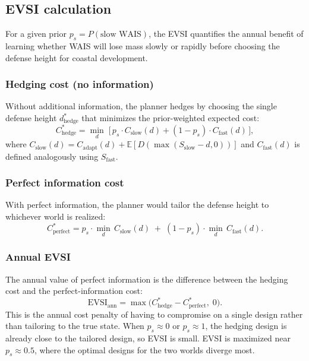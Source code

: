 \documentclass[12pt]{article}
\begin{document}
\subsection{EVSI calculation}

For a given prior $p_s = P(\text{slow WAIS})$, the EVSI quantifies the annual benefit of learning whether WAIS will lose mass slowly or rapidly before choosing the defense height for coastal development.

\subsubsection{Hedging cost (no information)}

Without additional information, the planner hedges by choosing the single defense height $d^*_{\mathrm{hedge}}$ that minimizes the prior-weighted expected cost:
\begin{equation}
C^*_{\mathrm{hedge}} = \min_{d}\; \bigl[\, p_s \cdot C_{\mathrm{slow}}(d) + (1 - p_s) \cdot C_{\mathrm{fast}}(d) \,\bigr],
\label{eq:hedge}
\end{equation}
where $C_{\mathrm{slow}}(d) = C_{\mathrm{adapt}}(d) + \mathbb{E}[D(\max(S_{\mathrm{slow}} - d, 0))]$ and $C_{\mathrm{fast}}(d)$ is defined analogously using $S_{\mathrm{fast}}$.

\subsubsection{Perfect information cost}

With perfect information, the planner would tailor the defense height to whichever world is realized:
\begin{equation}
C^*_{\mathrm{perfect}} = p_s \cdot \min_{d}\, C_{\mathrm{slow}}(d) \;+\; (1 - p_s) \cdot \min_{d}\, C_{\mathrm{fast}}(d).
\label{eq:perfect}
\end{equation}

\subsubsection{Annual EVSI}

The annual value of perfect information is the difference between the hedging cost and the perfect-information cost:
\begin{equation}
\mathrm{EVSI}_{\mathrm{ann}} = \max\bigl(C^*_{\mathrm{hedge}} - C^*_{\mathrm{perfect}},\; 0\bigr).
\label{eq:evsi}
\end{equation}
This is the annual cost penalty of having to compromise on a single design rather than tailoring to the true state. When $p_s \approx 0$ or $p_s \approx 1$, the hedging design is already close to the tailored design, so EVSI is small. EVSI is maximized near $p_s \approx 0.5$, where the optimal designs for the two worlds diverge most.
\end{document}

